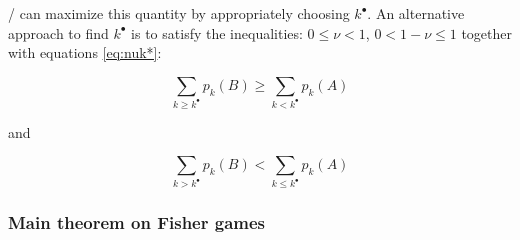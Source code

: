 \documentclass{article}
\theoremstyle{definition}
\begin{document}
\PI/ can maximize this quantity by appropriately choosing $k^\bullet$. 
An alternative approach to find $k^\bullet$ is to satisfy the inequalities: $0 \le \nu < 1$, $0<1-\nu\le1$ together with equations \eqref{eq:nuk*}:

\begin{equation}
    \sum_{k \geq k^\bullet} p_k(B) \ge \sum_{k < k^\bullet} p_k(A) 
\end{equation}

and

\begin{equation}
    \sum_{k > k^\bullet} p_k(B) < \sum_{k \leq k^\bullet} p_k(A)
\end{equation}

\subsubsection{Main theorem on Fisher games}
\end{document}
